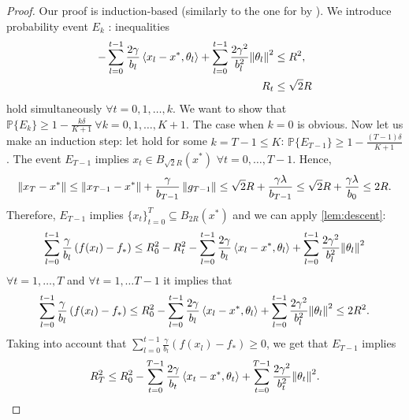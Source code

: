 \documentclass{article}
\begin{document}
\begin{proof}
    Our proof is induction-based (similarly to the one for  by \citet{sadiev2023high}). We introduce probability event $E_k$ : inequalities
    \begin{align*}
        - \sum\limits_{l=0}^{t-1} \frac{2\gamma}{b_l}\left \langle x_l - x^*, \theta_l \right \rangle + \sum\limits_{l=0}^{t-1} \frac{2\gamma^2}{b_l^2}{\left\lVert\theta_l\right\rVert}^2 &\leq R^2,\\
        R_t &\leq \sqrt{2}R
    \end{align*}
    hold simultaneously $\forall t = 0, 1, \ldots, k$. We want to show that $\mathbb{P}\{E_k\} \geq 1 - \frac{k\delta}{K+1} \ \forall k= 0, 1, \ldots, K+1$. The case when $k=0$ is obvious. Now let us make an induction step: let  hold for some $k = T-1 \leq K$: $\mathbb{P}\{E_{T-1}\} \geq 1 - \frac{(T-1)\delta}{K+1}$.  The event $E_{T-1}$ implies $x_t \in B_{\sqrt{2}R}(x^*)$ $\forall t = 0, \ldots, T-1$. Hence, 
    \begin{align*}
        \left\lVert x_T - x^*\right\rVert \leq \left\lVert x_{T-1} - x^*\right\rVert + \frac{\gamma}{b_{T-1}}\left\lVert g_{T-1}\right\rVert \leq \sqrt{2}R + \frac{\gamma \lambda}{b_{T-1}} \leq \sqrt{2}R + \frac{\gamma \lambda}{b_{0}} \leq 2R. 
    \end{align*}
    Therefore, $E_{T-1}$ implies $\{x_t\}_{t=0}^T \subseteq B_{2R}(x^*)$ and we can apply \cref{lem:descent}:
    \begin{align*}
    \sum\limits_{l=0}^{t-1} \frac{\gamma}{b_l}\left(f(x_l) - f_*\right) \leq R_0^2 - R_t^2 - \sum\limits_{l=0}^{t-1} \frac{2\gamma}{b_l}\left \langle x_l - x^*, \theta_l \right \rangle + \sum\limits_{l=0}^{t-1} \frac{2\gamma^2}{b_l^2}{\left\lVert\theta_l\right\rVert}^2 
    \end{align*}
    $\forall t=1, \ldots, T$ and $\forall t=1, \ldots T-1$ it implies that
    \begin{align*}
        \sum\limits_{l=0}^{t-1} \frac{\gamma}{b_l}\left(f(x_l) - f_*\right) \leq R_0^2 - \sum\limits_{l=0}^{t-1} \frac{2\gamma}{b_l}\left \langle x_l - x^*, \theta_l \right \rangle + \sum\limits_{l=0}^{t-1} \frac{2\gamma^2}{b_l^2}{\left\lVert\theta_l\right\rVert}^2 \leq 2R^2. 
    \end{align*}
    Taking into account that $\sum\limits_{l=0}^{t-1} \frac{\gamma}{b_l}\left(f(x_l) - f_*\right) \geq 0$, we get that $E_{T-1}$ implies
    \begin{align}
        \label{eq:convex-start}
        R_T^2 \leq R_0^2 - \sum\limits_{t=0}^{T-1} \frac{2\gamma}{b_t}\ev{x_t - x^*, \theta_t} + \sum\limits_{t=0}^{T-1} \frac{2\gamma^2}{b_t^2}\sqn{\theta_t}.

\end{align}
\end{proof}
\end{document}

